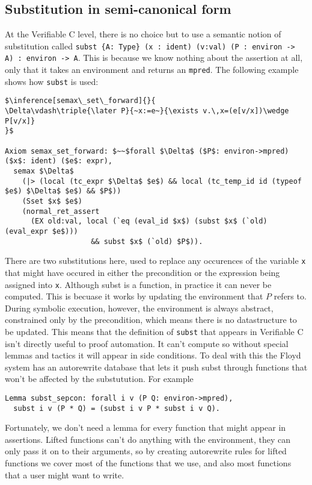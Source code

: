 \documentclass{puthesis}
\begin{document}
\subsection{Substitution in semi-canonical form}

At the Verifiable C level, there is no choice but to use a semantic
notion of substitution called 
\lstinline|subst {A: Type} (x : ident) (v:val) (P : environ -> A) : environ -> A|.
This is because we know nothing about the assertion at all, only that
it takes an environment and returns an \lstinline|mpred|. The following example
shows how \lstinline|subst| is used:

\begin{lstlisting}
$\inference[semax\_set\_forward]{}{
\Delta\vdash\triple{\later P}{~x:=e~}{\exists v.\,x=(e[v/x])\wedge P[v/x]}
}$

Axiom semax_set_forward: $~~$forall $\Delta$ ($P$: environ->mpred) ($x$: ident) ($e$: expr),
  semax $\Delta$
    (|> (local (tc_expr $\Delta$ $e$) && local (tc_temp_id id (typeof $e$) $\Delta$ $e$) && $P$))
    (Sset $x$ $e$) 
    (normal_ret_assert 
      (EX old:val, local (`eq (eval_id $x$) (subst $x$ (`old) (eval_expr $e$)))
                    && subst $x$ (`old) $P$)).
\end{lstlisting}

There are two substitutions here, used to replace any occurences of the
variable \lstinline|x| that might have occured in either the precondition
or the expression being assigned into \lstinline|x|. 
Although subst is a function, in practice it can never be computed.
This is becuase it works by updating the environment that $P$
refers to. During symbolic execution, however, the environment is always
abstract, constrained only by the precondition, which means there is
no datastructure to be updated. This means that the definition of 
\lstinline|subst| that appears in Verifiable C isn't directly 
useful to proof automation. It can't compute so without special
lemmas and tactics it will appear in side conditions. To deal with
this the Floyd system has an autorewrite database that lets it push
subst through functions that won't be affected by the substutution. For
example 

\begin{lstlisting}
Lemma subst_sepcon: forall i v (P Q: environ->mpred),
  subst i v (P * Q) = (subst i v P * subst i v Q).
\end{lstlisting}

Fortunately, we don't need a lemma for every function that might
appear in assertions. Lifted functions can't do anything with the
environment, they can only pass it on to their arguments, so
by creating autorewrite rules for lifted functions we cover
most of the functions that we use, and also most functions
that a user might want to write. 
\end{document}
